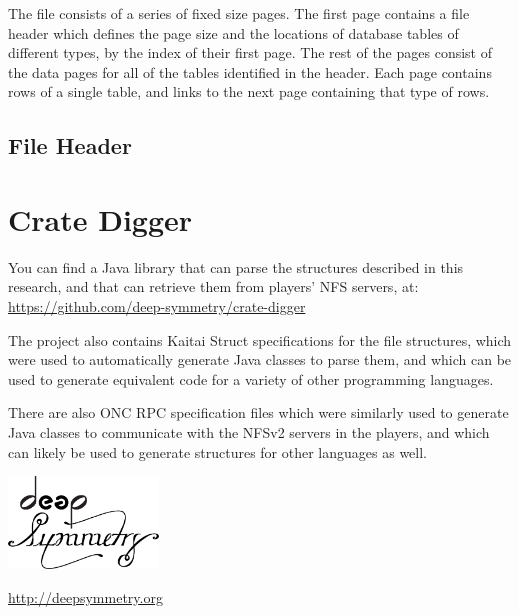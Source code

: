 \documentclass[11pt]{article}
\begin{document}
The file consists of a series of fixed size pages. The first page
contains a file header which defines the page size and the locations
of database tables of different types, by the index of their first
page. The rest of the pages consist of the data pages for all of the
tables identified in the header. Each page contains rows of a single
table, and links to the next page containing that type of rows.

\subsection{File Header}

\section{Crate Digger}

You can find a Java library that can parse the structures described in
this research, and that can retrieve them from players' NFS servers,
at: \url{https://github.com/deep-symmetry/crate-digger}

The project also contains Kaitai Struct specifications for the file
structures, which were used to automatically generate Java classes to
parse them, and which can be used to generate equivalent code for a
variety of other programming languages.

There are also ONC RPC specification files which were similarly used
to generate Java classes to communicate with the NFSv2 servers in the
players, and which can likely be used to generate structures for other
languages as well.

\begin{appendix}

  \listoffigures

  \listoftables

  \begin{center}
    \begin{samepage}
      \includegraphics[width=4cm]{assets/DS-Logo-bw-4k}

      \vspace{0.25cm}
      \url{http://deepsymmetry.org}
    \end{samepage}
  \end{center}

\end{appendix}
\end{document}
